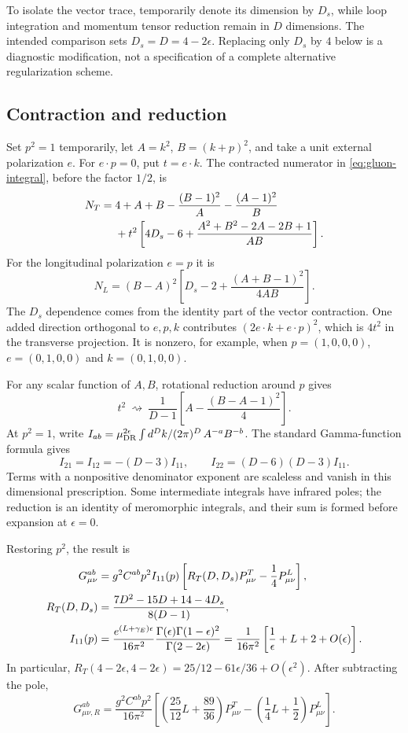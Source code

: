 \documentclass[11pt]{article}
\begin{document}
To isolate the vector trace, temporarily denote its dimension by $D_s$,
while loop integration and momentum tensor reduction remain in $D$
dimensions. The intended comparison sets $D_s=D=4-2\epsilon$.
Replacing only $D_s$ by $4$ below is a diagnostic modification, not a
specification of a complete alternative regularization scheme.

\subsection{Contraction and reduction}

Set $p^2=1$ temporarily, let $A=k^2$, $B=(k+p)^2$, and take a unit
external polarization $e$. For $e\cdot p=0$, put $t=e\cdot k$. The
contracted numerator in \eqref{eq:gluon-integral}, before the factor $1/2$,
is
\begin{align}
 N_T={}&4+A+B-\frac{(B-1)^2}{A}-\frac{(A-1)^2}{B}\notag\\
 &+t^2\left[4D_s-6+
 \frac{A^2+B^2-2A-2B+1}{AB}\right].\label{eq:gluon-numerator}
\end{align}
For the longitudinal polarization $e=p$ it is
\[
 N_L=(B-A)^2\left[D_s-2+\frac{(A+B-1)^2}{4AB}\right].
\]
The $D_s$ dependence comes from the identity part of the vector
contraction. One added direction orthogonal to $e,p,k$ contributes
$(2e\cdot k+e\cdot p)^2$, which is $4t^2$ in the transverse projection.
It is nonzero, for example, when $p=(1,0,0,0)$,
$e=(0,1,0,0)$ and $k=(0,1,0,0)$.

For any scalar function of $A,B$, rotational reduction around $p$ gives
\[
 t^2\ \rightsquigarrow\
 \frac{1}{D-1}\left[A-\frac{(B-A-1)^2}{4}\right].
\]
At $p^2=1$, write $I_{ab}=\mu_{\rm DR}^{2\epsilon}
\int d^Dk/(2\pi)^D\,A^{-a}B^{-b}$. The standard Gamma-function formula
gives
\[
 I_{21}=I_{12}=-(D-3)I_{11},\qquad
 I_{22}=(D-6)(D-3)I_{11}.
\]
Terms with a nonpositive denominator exponent are scaleless and vanish
in this dimensional prescription. Some intermediate integrals have
infrared poles; the reduction is an identity of meromorphic integrals,
and their sum is formed before expansion at $\epsilon=0$.

Restoring $p^2$, the result is
\begin{align}
 G^{ab}_{\mu\nu}
 &=g^2 C^{ab}p^2 I_{11}(p)
 \left[R_T(D,D_s)P^T_{\mu\nu}-\frac14P^L_{\mu\nu}\right],
 \label{eq:gluon-reduced}\\
 R_T(D,D_s)&=\frac{7D^2-15D+14-4D_s}{8(D-1)},\notag\\
 I_{11}(p)&=\frac{e^{(L+\gamma_E)\epsilon}}{16\pi^2}
 \frac{\Gamma(\epsilon)\Gamma(1-\epsilon)^2}
 {\Gamma(2-2\epsilon)}
 =\frac{1}{16\pi^2}\left[\frac1\epsilon+L+2+O(\epsilon)\right].\notag
\end{align}
In particular,
$R_T(4-2\epsilon,4-2\epsilon)=25/12-61\epsilon/36+O(\epsilon^2)$.
After subtracting the pole,
\begin{equation}\label{eq:gluon-finite}
 \boxed{G^{ab}_{\mu\nu,R}
 =\frac{g^2C^{ab}p^2}{16\pi^2}
 \left[\left(\frac{25}{12}L+\frac{89}{36}\right)P^T_{\mu\nu}
 -\left(\frac14L+\frac12\right)P^L_{\mu\nu}\right].}
\end{equation}
\end{document}
